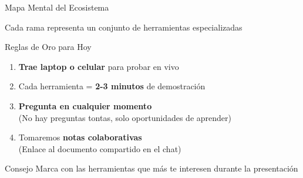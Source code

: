\documentclass[aspectratio=169,xcolor={dvipsnames}]{beamer}
\newcommand{\icono}[1]{\textcolor{azulUNSCH}{#1}}
\begin{document}
	\begin{frame}{Mapa Mental del Ecosistema}
		
		\begin{center}
		\end{center}
		
		\vspace{0.3cm}
		\centering
		\footnotesize
		Cada rama representa un conjunto de herramientas especializadas
		
	\end{frame}
	
	\begin{frame}{Reglas de Oro para Hoy}
		
		\begin{enumerate}
			\item \icono{\faLaptop} \textbf{Trae laptop o celular} para probar en vivo
			
			\item \icono{\faClock} Cada herramienta = \textbf{2-3 minutos} de demostración
			
			\item \icono{\faQuestion} \textbf{Pregunta en cualquier momento}\\
			(No hay preguntas tontas, solo oportunidades de aprender)
			
			\item \icono{\faEdit} Tomaremos \textbf{notas colaborativas}\\
			(Enlace al documento compartido en el chat)
		\end{enumerate}
		
		\vspace{0.5cm}
		
		\begin{block}{Consejo}
			Marca con \icono{\faStar} las herramientas que más te interesen durante la presentación
		\end{block}
		
	\end{frame}
	
\end{document}

